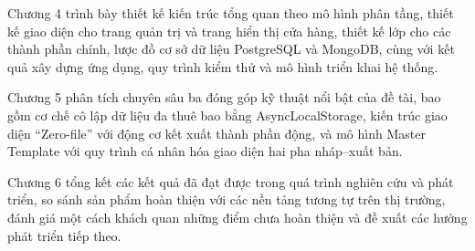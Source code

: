 \documentclass[../main.tex]{subfiles}
\begin{document}
Chương 4 trình bày thiết kế kiến trúc tổng quan theo mô hình phân tầng, thiết kế giao diện cho trang quản trị và trang hiển thị cửa hàng, thiết kế lớp cho các thành phần chính, lược đồ cơ sở dữ liệu PostgreSQL và MongoDB, cùng với kết quả xây dựng ứng dụng, quy trình kiểm thử và mô hình triển khai hệ thống.

Chương 5 phân tích chuyên sâu ba đóng góp kỹ thuật nổi bật của đề tài, bao gồm cơ chế cô lập dữ liệu đa thuê bao bằng AsyncLocalStorage, kiến trúc giao diện ``Zero-file'' với động cơ kết xuất thành phần động, và mô hình Master Template với quy trình cá nhân hóa giao diện hai pha nháp--xuất bản.

Chương 6 tổng kết các kết quả đã đạt được trong quá trình nghiên cứu và phát triển, so sánh sản phẩm hoàn thiện với các nền tảng tương tự trên thị trường, đánh giá một cách khách quan những điểm chưa hoàn thiện và đề xuất các hướng phát triển tiếp theo.
\end{document}
